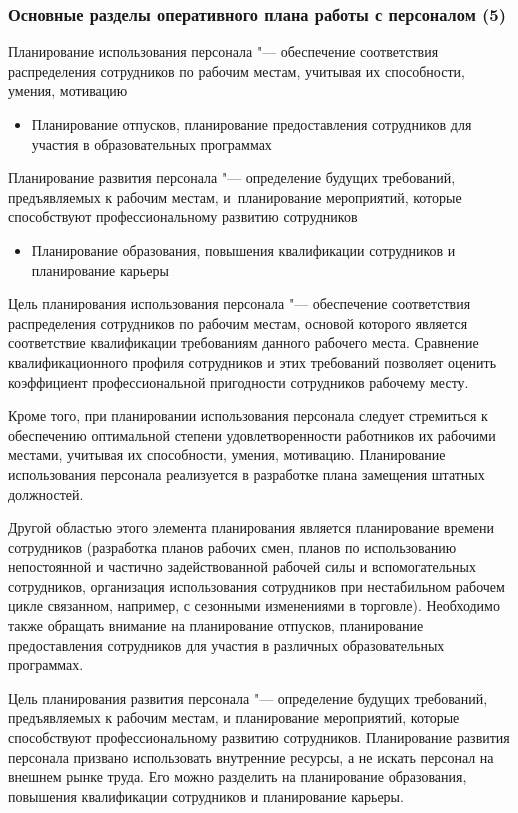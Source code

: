 \documentclass{../industrial-development}
\begin{document}
	\begin{frame} \frametitle{Основные разделы оперативного плана работы с персоналом (5)}
		\alert{Планирование использования персонала} "--- обеспечение соответствия распределения сотрудников по рабочим местам, учитывая их способности, умения, мотивацию
		\begin{itemize}
			\item {\small Планирование отпусков, планирование предоставления сотрудников для участия в образовательных программах}
		\end{itemize}	
		\alert{Планирование развития персонала} "--- определение будущих требований, предъявляемых к рабочим местам, и~планирование мероприятий, которые способствуют профессиональному развитию сотрудников
		\begin{itemize}
			\item {\small Планирование образования, повышения квалификации сотрудников и планирование карьеры}
		\end{itemize}
	\end{frame}
	\lecturenotes
	
	\alert{Цель планирования использования персонала} "--- обеспечение соответствия распределения сотрудников по рабочим местам, основой которого является соответствие квалификации требованиям данного рабочего места. Сравнение квалификационного профиля сотрудников и этих требований позволяет оценить коэффициент профессиональной пригодности сотрудников рабочему месту.
	
	Кроме того, при планировании использования персонала следует стремиться к обеспечению оптимальной степени удовлетворенности работников их рабочими местами, учитывая их способности, умения, мотивацию. Планирование использования персонала реализуется в разработке плана замещения штатных должностей.
	
	Другой областью этого элемента планирования является планирование времени сотрудников (разработка планов рабочих смен, планов по использованию непостоянной и частично задействованной рабочей силы и вспомогательных сотрудников, организация использования сотрудников при нестабильном рабочем цикле связанном, например, с сезонными изменениями в торговле). Необходимо также обращать внимание на планирование отпусков, планирование предоставления сотрудников для участия в различных образовательных программах.
	
	\alert{Цель планирования развития персонала} "---  определение будущих требований, предъявляемых к рабочим местам, и планирование мероприятий, которые способствуют профессиональному развитию сотрудников. Планирование развития персонала призвано использовать внутренние ресурсы, а не искать персонал на внешнем рынке труда. Его можно разделить на планирование образования, повышения квалификации сотрудников и планирование карьеры.
	
\end{document}
